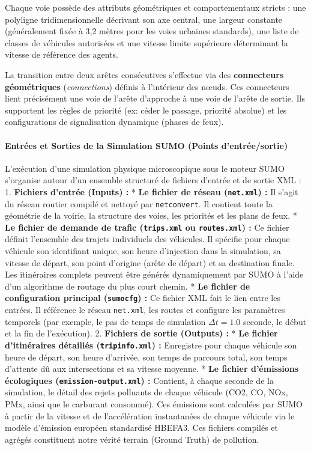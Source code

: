 \documentclass[10pt, a4paper]{article}
\begin{document}
Chaque voie possède des attributs géométriques et comportementaux
stricts : une polyligne tridimensionnelle décrivant son axe central, une
largeur constante (généralement fixée à 3,2 mètres pour les voies
urbaines standards), une liste de classes de véhicules autorisées et une
vitesse limite supérieure déterminant la vitesse de référence des
agents.

La transition entre deux arêtes consécutives s'effectue via des
\textbf{connecteurs géométriques} (\emph{connections}) définis à
l'intérieur des nœuds. Ces connecteurs lient précisément une voie de
l'arête d'approche à une voie de l'arête de sortie. Ils supportent les
règles de priorité (ex: céder le passage, priorité absolue) et les
configurations de signalisation dynamique (phases de feux).

\paragraph{Entrées et Sorties de la Simulation SUMO (Points
d'entrée/sortie)}\label{entruxe9es-et-sorties-de-la-simulation-sumo-points-dentruxe9esortie}

L'exécution d'une simulation physique microscopique sous le moteur SUMO
s'organise autour d'un ensemble structuré de fichiers d'entrée et de
sortie XML : 1. \textbf{Fichiers d'entrée (Inputs) :} * \textbf{Le
fichier de réseau (\texttt{net.xml}) :} Il s'agit du réseau routier
compilé et nettoyé par \texttt{netconvert}. Il contient toute la
géométrie de la voirie, la structure des voies, les priorités et les
plans de feux. * \textbf{Le fichier de demande de trafic
(\texttt{trips.xml} ou \texttt{routes.xml}) :} Ce fichier définit
l'ensemble des trajets individuels des véhicules. Il spécifie pour
chaque véhicule son identifiant unique, son heure d'injection dans la
simulation, sa vitesse de départ, son point d'origine (arête de départ)
et sa destination finale. Les itinéraires complets peuvent être générés
dynamiquement par SUMO à l'aide d'un algorithme de routage du plus court
chemin. * \textbf{Le fichier de configuration principal
(\texttt{sumocfg}) :} Ce fichier XML fait le lien entre les entrées. Il
référence le réseau \texttt{net.xml}, les routes et configure les
paramètres temporels (par exemple, le pas de temps de simulation
\(\Delta t = 1.0\) seconde, le début et la fin de l'exécution). 2.
\textbf{Fichiers de sortie (Outputs) :} * \textbf{Le fichier
d'itinéraires détaillés (\texttt{tripinfo.xml}) :} Enregistre pour
chaque véhicule son heure de départ, son heure d'arrivée, son temps de
parcours total, son temps d'attente dû aux intersections et sa vitesse
moyenne. * \textbf{Le fichier d'émissions écologiques
(\texttt{emission-output.xml}) :} Contient, à chaque seconde de la
simulation, le détail des rejets polluants de chaque véhicule (CO2, CO,
NOx, PMx, ainsi que le carburant consommé). Ces émissions sont calculées
par SUMO à partir de la vitesse et de l'accélération instantanées de
chaque véhicule via le modèle d'émission européen standardisé HBEFA3.
Ces fichiers compilés et agrégés constituent notre vérité terrain
(Ground Truth) de pollution.
\end{document}
